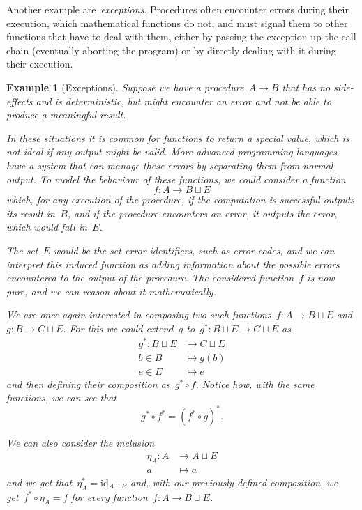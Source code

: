 \documentclass[a4paper]{article}
\theoremstyle{plain}
\newtheorem{example}[theorem]{Example}
\theoremstyle{definition}
\newcommand{\id}{\mathrm{id}}
\begin{document}
Another example are~\emph{exceptions}. Procedures often encounter errors during
their execution, which mathematical functions do not, and must signal them to
other functions that have to deal with them, either by passing the exception up
the call chain (eventually aborting the program) or by directly dealing with it
during their execution.

\begin{example}[Exceptions]
    Suppose we have a procedure~\(A\longrightarrow B\) that has no side-effects
    and is deterministic, but might encounter an error and not be able to
    produce a meaningful result.

    In these situations it is common for functions to return a special value,
    which is not ideal if any output might be valid. More advanced programming
    languages have a system that can manage these errors by separating them from
    normal output. To model the behaviour of these functions, we could consider
    a function
    \[
        f:A\longrightarrow B\sqcup E
    \]
    which, for any execution of the procedure, if the computation is successful
    outputs its result in~\(B\), and if the procedure encounters an error, it
    outputs the error, which would fall in~\(E\).

    The set~\(E\) would be the set error identifiers, such as error codes, and
    we can interpret this induced function as adding information about the
    possible errors encountered to the output of the procedure. The considered
    function~\(f\) is now pure, and we can reason about it mathematically.

    We are once again interested in composing two such
    functions~\(f:A\longrightarrow B\sqcup E\)
    and~\(g:B\longrightarrow C\sqcup E\). For this we could extend~\(g\)
    to~\(g^{\ast}:B\sqcup E\longrightarrow C\sqcup E\) as
    \begin{align*}
        g^{\ast}:B\sqcup E&\longrightarrow C\sqcup E \\
        b\in B&\longmapsto g(b) \\
        e\in E&\longmapsto e
    \end{align*}
    and then defining their composition as~\(g^{\ast}\circ f\). Notice how, with
    the same functions, we can see that
    \[
        g^{\ast} \circ f^{\ast} = (f^{\ast} \circ g)^{\ast}.
    \]

    We can also consider the inclusion
    \begin{align*}
        \eta_{A}:A&\longrightarrow A\sqcup E \\
        a&\longmapsto a
    \end{align*}
    and we get that~\(\eta_{A}^{\ast}=\id_{A\sqcup E}\) and, with our previously
    defined composition, we get~\(f^{\ast}\circ\eta_{A}=f\) for every
    function~\(f:A\longrightarrow B\sqcup E\).
\end{example}
\end{document}
